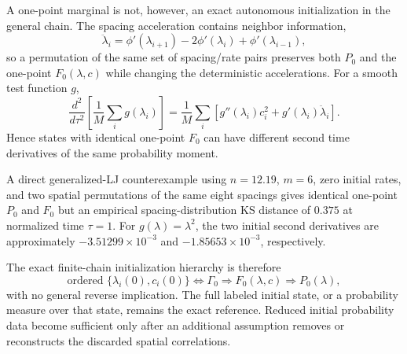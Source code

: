 A one-point marginal is not, however, an exact autonomous initialization in the general chain. The spacing acceleration contains neighbor information,
\begin{equation}
\ddot\lambda_i
=\phi'(\lambda_{i+1})-2\phi'(\lambda_i)+\phi'(\lambda_{i-1}),
\end{equation}
so a permutation of the same set of spacing/rate pairs preserves both \(P_0\) and the one-point \(F_0(\lambda,c)\) while changing the deterministic accelerations. For a smooth test function \(g\),
\begin{equation}
\frac{d^2}{d\tau^2}
\left[\frac1M\sum_i g(\lambda_i)\right]
=
\frac1M\sum_i
\left[g''(\lambda_i)c_i^2+g'(\lambda_i)\ddot\lambda_i\right].
\end{equation}
Hence states with identical one-point \(F_0\) can have different second time derivatives of the same probability moment.

A direct generalized-LJ counterexample using \(n=12.19\), \(m=6\), zero initial rates, and two spatial permutations of the same eight spacings gives identical one-point \(P_0\) and \(F_0\) but an empirical spacing-distribution KS distance of \(0.375\) at normalized time \(\tau=1\). For \(g(\lambda)=\lambda^2\), the two initial second derivatives are approximately \(-3.51299\times10^{-3}\) and \(-1.85653\times10^{-3}\), respectively.

The exact finite-chain initialization hierarchy is therefore
\begin{equation}
\text{ordered }\{\lambda_i(0),c_i(0)\}
\Longleftrightarrow \Gamma_0
\Longrightarrow F_0(\lambda,c)
\Longrightarrow P_0(\lambda),
\end{equation}
with no general reverse implication. The full labeled initial state, or a probability measure over that state, remains the exact reference. Reduced initial probability data become sufficient only after an additional assumption removes or reconstructs the discarded spatial correlations.
